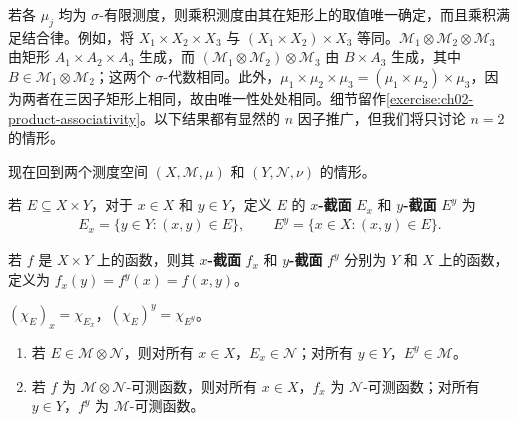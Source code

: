\documentclass[../../main.tex]{subfiles}%
\begin{document}
\begin{remark}
若各 $\mu_j$ 均为 $\sigma$-有限测度，则乘积测度由其在矩形上的取值唯一确定，而且乘积满足结合律。例如，将 $X_1\times X_2\times X_3$ 与 $(X_1\times X_2)\times X_3$ 等同。$\mathscr{M}_1\otimes\mathscr{M}_2\otimes\mathscr{M}_3$ 由矩形 $A_1\times A_2\times A_3$ 生成，而 $(\mathscr{M}_1\otimes\mathscr{M}_2)\otimes\mathscr{M}_3$ 由 $B\times A_3$ 生成，其中 $B\in\mathscr{M}_1\otimes\mathscr{M}_2$；这两个 $\sigma$-代数相同。此外，$\mu_1\times\mu_2\times\mu_3=(\mu_1\times\mu_2)\times\mu_3$，因为两者在三因子矩形上相同，故由唯一性处处相同。细节留作\cref{exercise:ch02-product-associativity}。以下结果都有显然的 $n$ 因子推广，但我们将只讨论 $n=2$ 的情形。
\end{remark}
现在回到两个测度空间 $(X,\mathscr{M},\mu)$ 和 $(Y,\mathscr{N},\nu)$ 的情形。
\begin{definition}[集合的截面]\label{definition:ch02-set-sections}
若 $E\subseteq X\times Y$，对于 $x\in X$ 和 $y\in Y$，定义 $E$ 的 \textbf{$x$-截面} $E_x$ 和 \textbf{$y$-截面} $E^y$ 为
\begin{align*}
E_x=\{y\in Y:(x,y)\in E\},\qquad E^y=\{x\in X:(x,y)\in E\}.
\end{align*}
\end{definition}
\begin{definition}[函数的截面]\label{definition:ch02-function-sections}
若 $f$ 是 $X\times Y$ 上的函数，则其 \textbf{$x$-截面} $f_x$ 和 \textbf{$y$-截面} $f^y$ 分别为 $Y$ 和 $X$ 上的函数，定义为 $f_x(y)=f^y(x)=f(x,y)$。
\end{definition}
\begin{example}\label{example:ch02-indicator-sections}
$(\chi_E)_x=\chi_{E_x}$，$(\chi_E)^y=\chi_{E^y}$。
\end{example}
\begin{proposition}\label{proposition:ch02-section-measurability}
\begin{enumerate}
\item\label{item:ch02-set-section-measurability} 若 $E\in\mathscr{M}\otimes\mathscr{N}$，则对所有 $x\in X$，$E_x\in\mathscr{N}$；对所有 $y\in Y$，$E^y\in\mathscr{M}$。
\item\label{item:ch02-function-section-measurability} 若 $f$ 为 $\mathscr{M}\otimes\mathscr{N}$-可测函数，则对所有 $x\in X$，$f_x$ 为 $\mathscr{N}$-可测函数；对所有 $y\in Y$，$f^y$ 为 $\mathscr{M}$-可测函数。
\end{enumerate}
\end{proposition}
\end{document}
